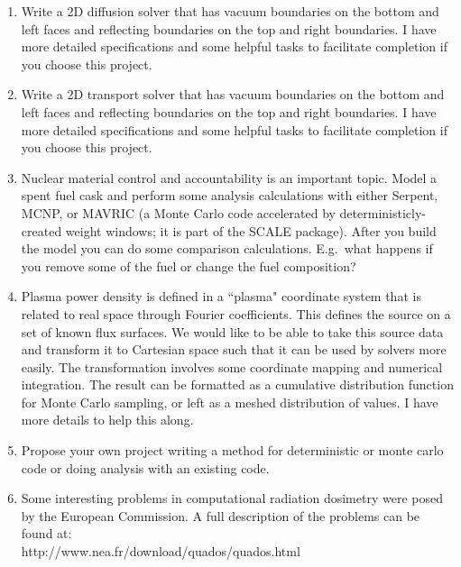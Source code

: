 \documentclass[12pt]{article}
\begin{document}
\begin{enumerate}
\item Write a 2D diffusion solver that has vacuum boundaries on the bottom and left faces and reflecting boundaries on the top and right boundaries. I have more detailed specifications and some helpful tasks to facilitate completion if you choose this project. 

\item Write a 2D transport solver that has vacuum boundaries on the bottom and left faces and reflecting boundaries on the top and right boundaries. I have more detailed specifications and some helpful tasks to facilitate completion if you choose this project. 

\item Nuclear material control and accountability is an important topic. Model a spent fuel cask and perform some analysis calculations with either Serpent, MCNP, or MAVRIC (a Monte Carlo code accelerated by deterministicly-created weight windows; it is part of the SCALE package). After you build the model you can do some comparison calculations. E.g.\ what happens if you remove some of the fuel or change the fuel composition?

\item Plasma power density is defined in a ``plasma" coordinate system that is related to real space through Fourier coefficients. This defines the source on a set of known flux surfaces. We would like to be able to take this source data and transform it to Cartesian space such that it can be used by solvers more easily. The transformation involves some coordinate mapping and numerical integration. The result can be formatted as a cumulative distribution function for Monte Carlo sampling, or left as a meshed distribution of values. I have more details to help this along.


\item Propose your own project writing a method for deterministic or monte carlo code or doing analysis with an existing code. 

\item Some interesting problems in computational radiation dosimetry were posed by the European Commission. A full description of the problems can be found at:\\
http://www.nea.fr/download/quados/quados.html


\end{enumerate}
\end{document}
